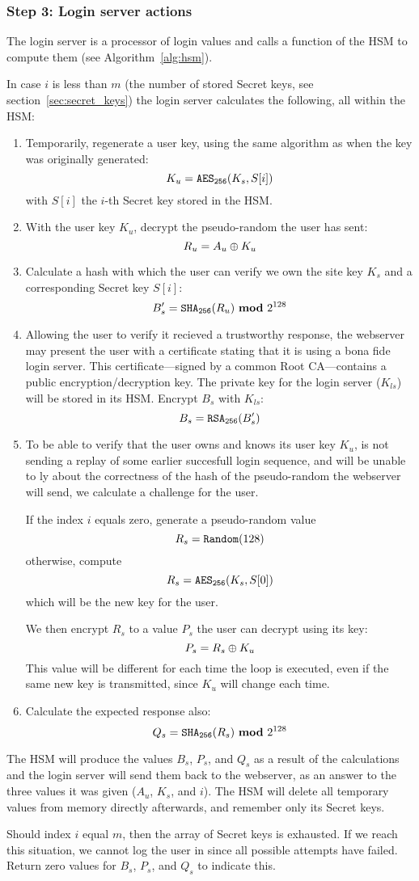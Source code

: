 \subsubsection{Step 3: Login server actions}
\label{sec:login_step3}
The login server is a processor of login values and calls a function of the HSM to compute them
(see Algorithm~\vref{alg:hsm}).
\par
In case $i$ is less than $m$
(the number of stored Secret keys, see section~\vref{sec:secret_keys})
the login server calculates the following, all within the HSM:
\begin{enumerate}
\item Temporarily, regenerate a user key, using the same algorithm as when the key was originally generated:
\[K_u=\texttt{\ensuremath{\mathtt{AES_{256}}}}(K_s,S[i])\]
with $S[i]$ the $i$-th Secret key stored in the HSM.
\item With the user key $K_u$, decrypt the pseudo-random the user has sent:
\[R_u=A_u\oplus K_u\]
\item Calculate a hash with which the user can verify we own the site key $K_s$ and a corresponding Secret key $S[i]$:
\[B_s'=\texttt{\ensuremath{\mathtt{SHA_{256}}}}(R_u)\ \textbf{mod}\ 2^{128}\]
\item Allowing the user to verify it recieved a trustworthy response,
the webserver may present the user with a certificate stating that it is using a bona fide login server.
This certificate---signed by a common Root CA---contains a public encryption/decryption key.
The private key for the login server ($K_{ls}$) will be stored in its HSM. 
Encrypt $B_s$ with $K_{ls}$:
\[B_s=\texttt{\ensuremath{\mathtt{RSA_{256}}}}(B_s')\]
\item To be able to verify that the user owns and knows its user key $K_u$,
is not sending a replay of some earlier succesfull login sequence,
and will be unable to ly about the correctness of the hash of the pseudo-random the webserver will send,
we calculate a challenge for the user.
\par
If the index $i$ equals zero, generate a pseudo-random value
\[R_s=\texttt{Random}(128)\]
otherwise, compute
\[R_s=\texttt{\ensuremath{\mathtt{AES_{256}}}}(K_s,S[0])\]
which will be the new key for the user.
\par
We then encrypt $R_s$ to a value $P_s$ the user can decrypt using its key:
\[P_s=R_s\oplus K_u\]
This value will be different for each time the loop is executed,
even if the same new key is transmitted,
since $K_u$ will change each time.
\item Calculate the expected response also:
\[Q_s=\texttt{\ensuremath{\mathtt{SHA_{256}}}}(R_s)\ \textbf{mod}\ 2^{128}\]
\end{enumerate}
The HSM will produce the values $B_s$,
$P_s$,
and $Q_s$ as a result of the calculations and the login server will send them back to the webserver,
as an answer to the three values it was given ($A_u$, $K_s$, and $i$).
The HSM will delete all temporary values from memory directly afterwards, and remember only its Secret keys.
\par
Should index $i$ equal $m$, then the array of Secret keys is exhausted.
If we reach this situation, we cannot log the user in since all possible attempts have failed.
Return zero values for $B_s$, $P_s$, and $Q_s$ to indicate this.

